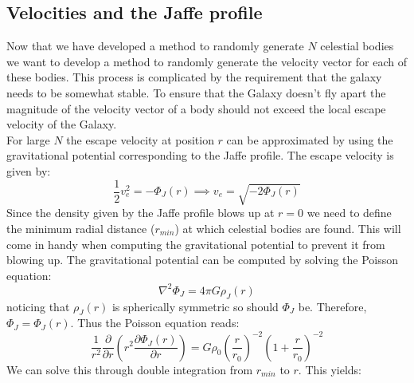 \documentclass[]{article}
\begin{document}
\subsection{Velocities and the Jaffe profile}
Now that we have developed a method to randomly generate $N$ celestial bodies we want to develop a method to randomly generate the velocity vector for each of these bodies. This process is complicated by the requirement that the galaxy needs to be somewhat stable. To ensure that the Galaxy doesn't fly apart the magnitude of the velocity vector of a body should not exceed the local escape velocity of the Galaxy.\\
For large $N$ the escape velocity at position $r$ can be approximated by using the gravitational potential corresponding to the Jaffe profile. The escape velocity is given by:
\begin{equation*}
	\frac{1}{2}v_e^2 = -\Phi_{J}(r) \implies \boxed{v_e = \sqrt{-2\Phi_{J}(r)}}
\end{equation*}
Since the density given by the Jaffe profile blows up at $r=0$ we need to define the minimum radial distance ($r_{min}$) at which celestial bodies are found. This will come in handy when computing the gravitational potential to prevent it from blowing up. The gravitational potential can be computed by solving the Poisson equation:
\begin{equation*}
	\nabla^2\Phi_{J} = 4\pi G\rho_{J}(r)
\end{equation*}
noticing that $\rho_{J}(r)$ is spherically symmetric so should $\Phi_{J}$ be. Therefore, $\Phi_J = \Phi_J(r)$. Thus the Poisson equation reads:
\begin{equation*}
	\frac{1}{r^2}\frac{\partial}{\partial r}\left(r^2\frac{\partial\Phi_{J}(r)}{\partial r}\right) = G\rho_0\left(\frac{r}{r_0}\right)^{-2}\left(1+\frac{r}{r_0}\right)^{-2}
\end{equation*}
We can solve this through double integration from $r_{min}$ to $r$. This yields:
\end{document}

